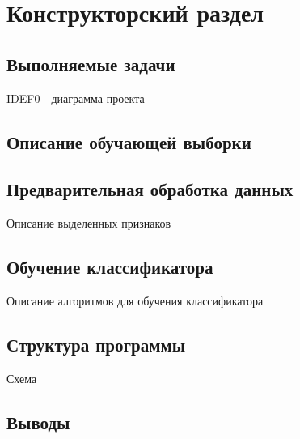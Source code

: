 \chapter{Конструкторский раздел}
\label{cha:design}

\section{Выполняемые задачи}
IDEF0 - диаграмма проекта

\section{Описание обучающей выборки}


\section{Предварительная обработка данных}
Описание выделенных признаков

\section{Обучение классификатора}
Описание алгоритмов для обучения классификатора

\section{Структура программы}
Схема 

\section{Выводы}

